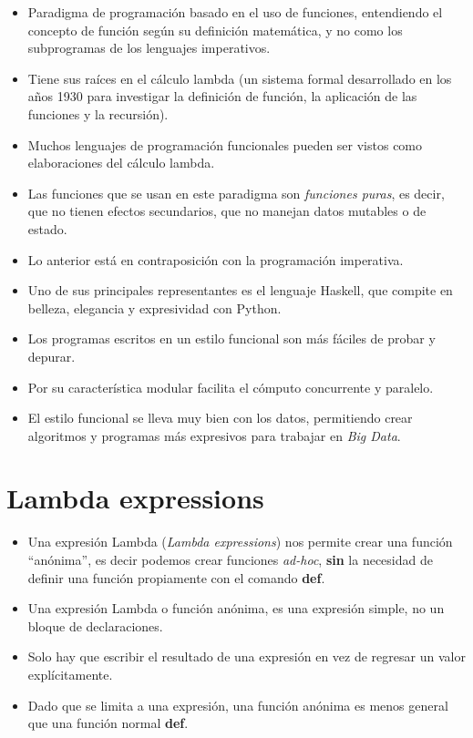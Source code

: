 \documentclass[
  letterpaper,
  DIV=11,
  numbers=noendperiod]{scrreprt}
\begin{document}
\begin{itemize}
\item
  Paradigma de programación basado en el uso de funciones, entendiendo
  el concepto de función según su definición matemática, y no como los
  subprogramas de los lenguajes imperativos.
\item
  Tiene sus raíces en el cálculo lambda (un sistema formal desarrollado
  en los años 1930 para investigar la definición de función, la
  aplicación de las funciones y la recursión).
\item
  Muchos lenguajes de programación funcionales pueden ser vistos como
  elaboraciones del cálculo lambda.
\item
  Las funciones que se usan en este paradigma son \emph{funciones
  puras}, es decir, que no tienen efectos secundarios, que no manejan
  datos mutables o de estado.
\item
  Lo anterior está en contraposición con la programación imperativa.
\item
  Uno de sus principales representantes es el lenguaje Haskell, que
  compite en belleza, elegancia y expresividad con Python.
\item
  Los programas escritos en un estilo funcional son más fáciles de
  probar y depurar.
\item
  Por su característica modular facilita el cómputo concurrente y
  paralelo.
\item
  El estilo funcional se lleva muy bien con los datos, permitiendo crear
  algoritmos y programas más expresivos para trabajar en \emph{Big
  Data}.
\end{itemize}


\chapter{Lambda expressions}\label{lambda-expressions}

\begin{itemize}
\item
  Una expresión Lambda (\emph{Lambda expressions}) nos permite crear una
  función ``anónima'', es decir podemos crear funciones \emph{ad-hoc},
  \textbf{sin} la necesidad de definir una función propiamente con el
  comando \textbf{def}.
\item
  Una expresión Lambda o función anónima, es una expresión simple, no un
  bloque de declaraciones.
\item
  Solo hay que escribir el resultado de una expresión en vez de regresar
  un valor explícitamente.
\item
  Dado que se limita a una expresión, una función anónima es menos
  general que una función normal \textbf{def}.
\end{itemize}
\end{document}
